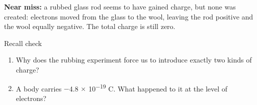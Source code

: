 \documentclass[11pt]{article}
\begin{document}
\begin{keepsection}
\begin{notebox}\textbf{Near miss:} a rubbed glass rod seems to have gained charge, but none was created: electrons moved from the glass to the wool, leaving the rod positive and the wool equally negative. The total charge is still zero.\end{notebox}

\begin{recallbox}{Recall check}
\begin{enumerate}
\item Why does the rubbing experiment force us to introduce exactly two kinds of charge?
\item A body carries \ensuremath{-}4.8 \ensuremath{\times} 10\textsuperscript{\ensuremath{-}19} C. What happened to it at the level of electrons?
\end{enumerate}

\end{recallbox}
\end{keepsection}
\end{document}

